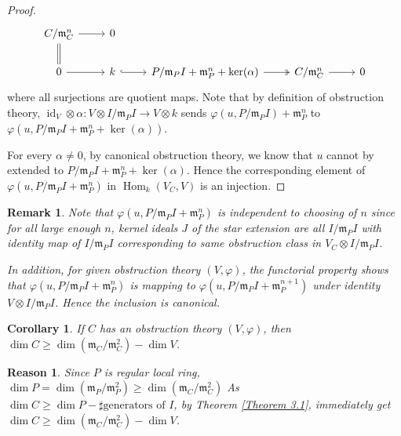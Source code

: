 \documentclass{ctexart}
\newtheorem{remark}{Remark}[section]
\newtheorem{reason}{Reason}[section]
\newtheorem{corollary}{Corollary}[section]
\renewcommand{\hom}{\operatorname{Hom}}
\newcommand{\identity}{\operatorname{id}}
\begin{document}
\begin{proof}
\begin{equation}
\begin{tikzcd}
            C/\mathfrak{m}_{C}^{n} \arrow[r] \arrow[d, equal] &
            0 \\
            0 \arrow[r] &
            k \arrow[r, hookrightarrow] &
            P/\mathfrak{m}_{P}I + \mathfrak{m}_{P}^{n} + \ker(\alpha) \arrow[r, twoheadrightarrow] &
            C/\mathfrak{m}_{C}^{n} \arrow[r] &
            0
        \end{tikzcd}
    \end{equation}
    where all surjections are quotient maps.
    Note that by definition of obstruction theory, $\identity_{V} \otimes \alpha: V \otimes I/\mathfrak{m}_{P}I \rightarrow V \otimes k$ sends $\varphi(u, P/\mathfrak{m}_{P}I) + \mathfrak{m}_{P}^{n}$ to $\varphi(u, P/\mathfrak{m}_{P}I + \mathfrak{m}_{P}^{n} + \ker(\alpha))$.
    \par
    For every $\alpha \neq 0$, by canonical obstruction theory, we know that $u$ cannot by extended to $P/\mathfrak{m}_{P}I + \mathfrak{m}_{P}^{n} + \ker(\alpha)$.
    Hence the corresponding element of $\varphi(u, P/\mathfrak{m}_{P}I + \mathfrak{m}_{P}^{n})$ in $\hom_{k}(V_{C}, V)$ is an injection. 
\end{proof}
\begin{remark}
    Note that $\varphi(u, P/\mathfrak{m}_{P}I + \mathfrak{m}_{P}^{n})$ is independent to choosing of $n$ since for all large enough $n$,
    kernel ideals $J$ of the star extension are all $I/\mathfrak{m}_{P}I$ with identity map of $I/\mathfrak{m}_{P}I$ corresponding to same obstruction class in $V_{C} \otimes I/\mathfrak{m}_{P}I$.
    \par
    In addition, for given obstruction theory $(V, \varphi)$, the functorial property shows that $\varphi(u, P/\mathfrak{m}_{P}I + \mathfrak{m}_{P}^{n})$ is mapping to $\varphi(u, P/\mathfrak{m}_{P}I + \mathfrak{m}_{P}^{n + 1})$ under identity $V \otimes I/\mathfrak{m}_{P}I$.
    Hence the inclusion is canonical.
\end{remark}
\begin{corollary}
    If $C$ has an obstruction theory $(V, \varphi)$, then $\dim C \ge \dim(\mathfrak{m}_{C}/\mathfrak{m}_{C}^{2}) - \dim V$.
    \label{Corollary 3.1}
\end{corollary}
\begin{reason}
    Since $P$ is regular local ring, $\dim P = \dim(\mathfrak{m}_{P}/\mathfrak{m}_{P}^{2}) \ge \dim(\mathfrak{m}_{C}/\mathfrak{m}_{C}^{2})$
    As $\dim C \ge \dim P - \sharp\text{generators of $I$}$, 
    by Theorem \ref{Theorem 3.1}, immediately get $\dim C \ge \dim(\mathfrak{m}_{C}/\mathfrak{m}_{C}^{2}) - \dim V$.
\end{reason}
\end{document}
